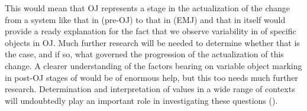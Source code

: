 \documentclass[output=paper]{LSP/langsci}
\begin{document}
This would mean that OJ represents a stage in the actualization of the change from a system like that in  (pre-OJ) to that in  (EMJ) and that in itself would provide a ready explanation for the fact that we observe variability in  of specific objects in OJ. Much further research will be needed to determine whether that is the case, and if so, what governed the progression of the actualization of this change. A clearer understanding of the factors bearing on variable object marking in post-OJ stages of  would be of enormous help, but this too needs much further research. Determination and interpretation of  values in a wide range of contexts will undoubtedly play an important role in investigating these questions (\cf \citealt{Andersen2001Actualization, Andersen2001Markedness}).
\end{document}

